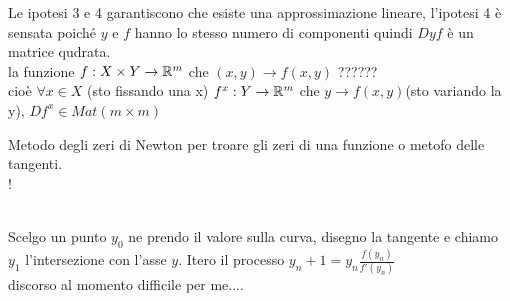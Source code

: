 \observation
Le ipotesi 3 e 4 garantiscono che esiste una approssimazione lineare, l'ipotesi 4 è sensata poiché $y$ e $f$ hanno lo stesso numero di componenti quindi $Dyf$ è un matrice qudrata.\\
la funzione $f:X\times Y\rightarrow \mathbb{R}^m$ che $(x,y)\rightarrow f(x,y)$ ??????\\
cioè $\forall x\in X$ (sto fissando una x) $f^x:Y\rightarrow \mathbb{R}^m$ che $y\rightarrow f(x,y)$(sto variando la y), $Df^x\in Mat(m\times m)$

\observation Metodo degli zeri di Newton per troare gli zeri di una funzione o metofo delle tangenti.\\
\resizebox {\columnwidth} {!} {
}\\
Scelgo un punto $y_0$ ne prendo il valore sulla curva, disegno la tangente e chiamo $y_1$ l'intersezione con l'asse $y$. Itero il processo $y_n+1=y_n\frac{f(y_n)}{f'(y_n)}$\\
discorso al momento difficile per me....\\
